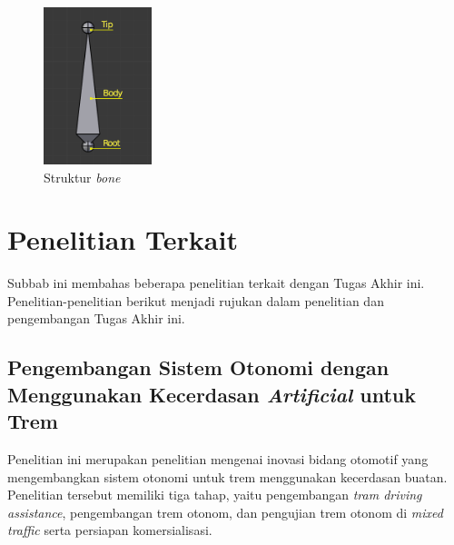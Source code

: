 \begin{figure}[ht]
    \centering
    \includegraphics[width=0.28\textwidth]{resources/chapter-2-bone-structure.png}
    \caption{Struktur \textit{bone} \parencite{blender-manual}}
    \label{fig:bone-structure}
\end{figure}



\section{Penelitian Terkait}

Subbab ini membahas beberapa penelitian terkait dengan Tugas Akhir ini.
Penelitian-penelitian berikut menjadi rujukan dalam penelitian dan pengembangan
Tugas Akhir ini.

\subsection{Pengembangan Sistem Otonomi dengan Menggunakan Kecerdasan \textit{Artificial} untuk Trem \parencite{rispro-trilaksono}}
\label{subsec:rispro-trilaksono}

Penelitian ini merupakan penelitian mengenai inovasi bidang otomotif yang
mengembangkan sistem otonomi untuk trem menggunakan kecerdasan buatan.
Penelitian tersebut memiliki tiga tahap, yaitu pengembangan \textit{tram driving
assistance}, pengembangan trem otonom, dan pengujian trem otonom di
\textit{mixed traffic} serta persiapan komersialisasi.

